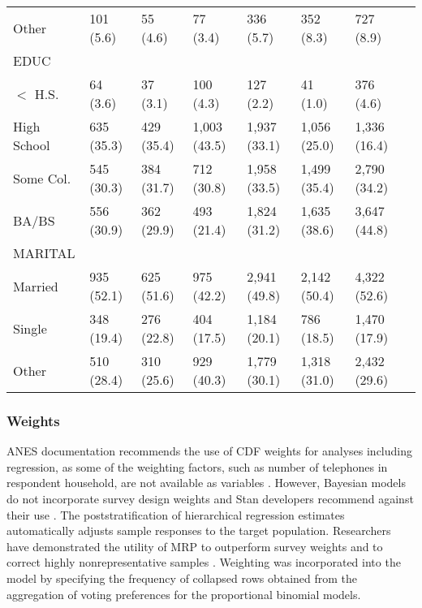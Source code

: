 \begin{table}
\begin{threeparttable}
\begin{tabular}{llllllll}
    Other & 101 (5.6) & 55 (4.6) & 77 (3.4) & 336 (5.7) & 352 (8.3) & 727 (8.9) \vspace{0.5em}\\ 
EDUC     & &  & & & & &\\ 
  $<$ H.S. & 64 (3.6) & 37 (3.1) & 100 (4.3) & 127 (2.2) & 41 (1.0) & 376 (4.6) \\ 
    High School & 635 (35.3) & 429 (35.4) & 1,003 (43.5) & 1,937 (33.1) & 1,056 (25.0) & 1,336 (16.4) \\ 
    Some Col. & 545 (30.3) & 384 (31.7) & 712 (30.8) & 1,958 (33.5) & 1,499 (35.4) & 2,790 (34.2) \\ 
    BA/BS & 556 (30.9) & 362 (29.9) & 493 (21.4) & 1,824 (31.2) & 1,635 (38.6) & 3,647 (44.8) \vspace{0.5em}\\ 
 MARITAL     & &  & & & & &\\ 
  Married & 935 (52.1) & 625 (51.6) & 975 (42.2) & 2,941 (49.8) & 2,142 (50.4) & 4,322 (52.6) \\ 
    Single & 348 (19.4) & 276 (22.8) & 404 (17.5) & 1,184 (20.1) & 786 (18.5) & 1,470 (17.9) \\ 
    Other & 510 (28.4) & 310 (25.6) & 929 (40.3) & 1,779 (30.1) & 1,318 (31.0) & 2,432 (29.6) \vspace{0.5em}\\ 
   \hline
\end{tabular}
\end{threeparttable}
\end{table}
\newpage

\subsubsection{Weights}

ANES documentation recommends the use of CDF weights for analyses including regression, as some of the weighting factors, such as number of telephones in respondent household, are not available as variables \citep{debell_how_2010}. However, Bayesian models do not incorporate survey design weights and Stan developers recommend against their use \citep{stan_development_team_stan_2021, hanretty_introduction_2019, gelman_struggles_2007}. The poststratification of hierarchical regression estimates automatically adjusts sample responses to the target population. Researchers have demonstrated the utility of MRP to outperform survey weights and to correct highly nonrepresentative samples \citep{downes_multilevel_2018, downes_multilevel_2020, wang_forecasting_2014}. Weighting was incorporated into the model by specifying the frequency of collapsed rows obtained from the aggregation of voting preferences for the proportional binomial models.  


